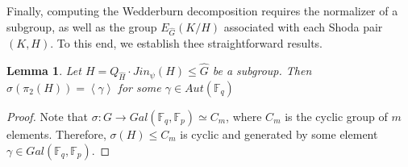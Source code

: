 \documentclass{article}
\newtheorem{lemma}[theorem]{Lemma}
\begin{document}
Finally, computing the Wedderburn decomposition requires the normalizer of a subgroup, as well as the group $E_{\hat{G}}(K/H)$ associated with each Shoda pair $(K,H)$. To this end, we establish thee straightforward results.

\begin{lemma}
     Let $H=Q_{\hat{H}} \cdot Jin_\psi(H) \leq \hat{G}$ be a subgroup. Then $\sigma(\pi_2(H)) = \left \langle \gamma \right \rangle$ for some $\gamma \in Aut(\mathbb{F}_q)$
\end{lemma}
\begin{proof}
    Note that $\sigma : G \longrightarrow Gal(\mathbb{F}_q,\mathbb{F}_p) \simeq C_m$, where $C_m$ is the cyclic group of $m$ elements. Therefore, $\sigma (H) \leq C_m$ is cyclic and generated by some element $\gamma \in Gal(\mathbb{F}_q,\mathbb{F}_p)$. 
\end{proof}
\end{document}
